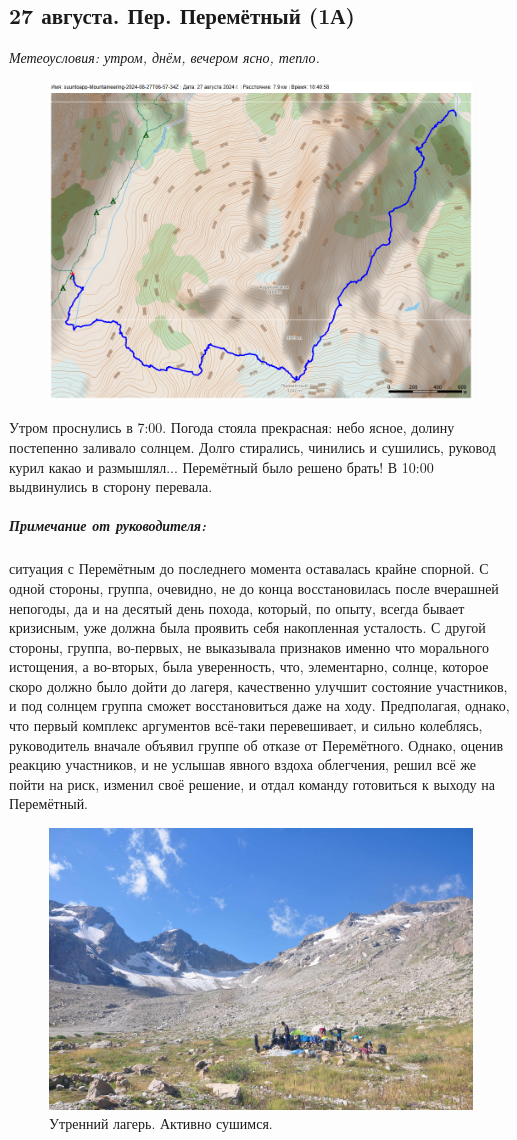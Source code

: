 \subsection{27 августа. Пер. Перемётный (1А)}
\textit{Метеоусловия: утром, днём, вечером ясно, тепло.}
\begin{figure}[h!]
	\centering
	\includegraphics[angle=0, width=0.7\linewidth]{../pics/mini_maps/27}
	\label{fig:mini_27}
\end{figure}

Утром проснулись в 7:00. Погода стояла прекрасная: небо ясное, долину постепенно заливало солнцем. Долго стирались, чинились и сушились, руковод курил какао и размышлял... Перемётный было решено брать!
В 10:00 выдвинулись в сторону перевала. 

\subparagraph{Примечание от руководителя:} ситуация с Перемётным до последнего момента оставалась крайне спорной. С одной стороны, группа, очевидно, не до конца восстановилась после вчерашней непогоды, да и на десятый день похода, который, по опыту, всегда бывает кризисным, уже должна была проявить себя накопленная усталость. С другой стороны, группа, во-первых, не выказывала признаков именно что морального истощения, а во-вторых, была уверенность, что, элементарно, солнце, которое скоро должно было дойти до лагеря, качественно улучшит состояние участников, и под солнцем группа сможет восстановиться даже на ходу. Предполагая, однако, что первый комплекс аргументов всё-таки перевешивает, и сильно колеблясь, руководитель вначале объявил группе об отказе от Перемётного. Однако, оценив реакцию участников, и не услышав явного вздоха облегчения, решил всё же пойти на риск, изменил своё решение, и отдал команду готовиться к выходу на Перемётный.

\begin{figure}[h!]
	\centering
	\includegraphics[width=0.7\linewidth]{../pics/DSC_0251.jpg}
	\caption{Утренний лагерь. Активно сушимся.}
	\label{fig:DSC_0251}
\end{figure}

